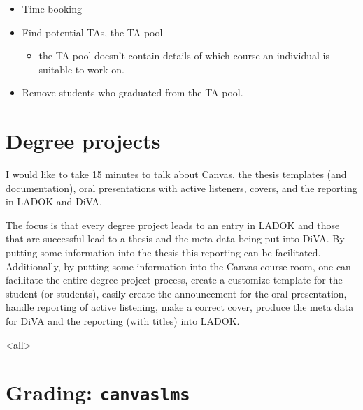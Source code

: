 \begin{frame}[fragile]\label<2>{WishTA}
  \begin{example}
    \begin{itemize}
      \item \alert<2>{Time booking}

      \item \alert<2>{Find potential TAs, the TA pool}
        \begin{itemize}
          \item the TA pool doesn't contain details of which course an 
            individual is suitable to work on.
        \end{itemize}

      \item \alert<2>{Remove students who graduated from the TA pool.}
    \end{itemize}
  \end{example}
\end{frame}


\section{Degree projects}

I would like to take 15 minutes to talk about Canvas, the thesis templates      
(and documentation), oral presentations with active listeners, covers, and      
the reporting in LADOK and DiVA.                                                
                                                                                
The focus is that every degree project leads to an entry in LADOK and those     
that are successful lead to a thesis and the meta data being put into DiVA.     
By putting some information into the thesis this reporting can be               
facilitated. Additionally, by putting some information into the Canvas          
course room, one can facilitate the entire degree project process, create a     
customize template for the student (or students), easily create the             
announcement for the oral presentation, handle reporting of active              
listening, make a correct cover, produce the meta data for DiVA and the         
reporting (with titles) into LADOK.

\mode<all>{}


\section[Grading]{Grading: \texttt{canvaslms}}

